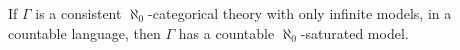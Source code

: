 \begin{corollary}[28.8]
\label{cor:aleph0-categorical-countable-saturated}
If $\Gamma$ is a consistent $\aleph_0$-categorical theory with only infinite models, in a countable language, then $\Gamma$ has a countable $\aleph_0$-saturated model.
\end{corollary}
